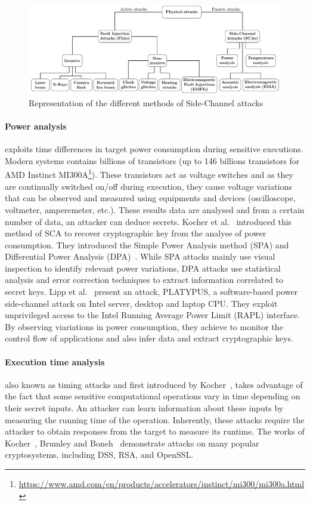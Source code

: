 \begin{figure}[ht]
    \centering
    \includegraphics[page=3, width=.75\textwidth]{c2_soa/img/physicalAttacks.pdf}
    \caption{Representation of the different methods of Side-Channel attacks}
    \label{fig:sca}
\end{figure}

\paragraph{Power analysis} exploits time differences in target power consumption during sensitive executions. Modern systems contains billions of transistors (up to 146 billions transistors for AMD Instinct MI300A\footnote{\url{https://www.amd.com/en/products/accelerators/instinct/mi300/mi300a.html}}). These transistors act as voltage switches and as they are continually switched on/off during execution, they cause voltage variations that can be observed and measured using equipments and devices (oscilloscope, voltmeter, amperemeter, etc.). These results data are analysed and from a certain number of data, an attacker can deduce secrets.
Kocher et al.~\cite{KJJ-98-crypto,KJJR-11-jce} introduced this method of SCA to recover cryptographic key from the analyse of power consumption. They introduced the Simple Power Analysis method (SPA) and Differential Power Analysis (DPA)~\cite{GP-99-ches}. While SPA attacks mainly use visual inspection to identify relevant power variations, DPA attacks use statistical analysis and error correction techniques to extract information correlated to secret keys.
Lipp et al.~\cite{LKOSECG-21-sp} present an attack, PLATYPUS, a software-based power side-channel attack on Intel server, desktop and laptop CPU. They exploit unprivileged access to the Intel Running Average Power Limit (RAPL) interface. By observing viariations in power consumption, they achieve to monitor the control flow of applications and also infer data and extract cryptographic keys.

\paragraph{Execution time analysis} also known as timing attacks and first introduced by Kocher~\cite{K-96-crypto}, takes advantage of the fact that some sensitive computational operations vary in time depending on their secret inputs. An attacker can learn information about these inputs by measuring the running time of the operation. Inherently, these attacks require the attacker to obtain responses from the target to measure its runtime. The works of Kocher~\cite{K-96-crypto}, Brumley and Boneh~\cite{DD-05-compnet} demonstrate attacks on many popular cryptosystems, including DSS, RSA, and OpenSSL.

